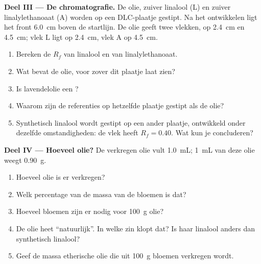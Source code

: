 \begin{problem}
\medskip
\noindent\textbf{Deel III --- De chromatografie.}
De olie, zuiver linalool (L) en zuiver linalylethanoaat (A) worden op een
DLC-plaatje gestipt. Na het ontwikkelen ligt het front \qty{6.0}{cm}
boven de startlijn. De olie geeft twee vlekken, op \qty{2.4}{cm} en
\qty{4.5}{cm}; vlek L ligt op \qty{2.4}{cm}, vlek A op \qty{4.5}{cm}.
\begin{enumerate}[resume]
  \item Bereken de $R_f$ van linalool en van linalylethanoaat.
  \item Wat bevat de olie, voor zover dit plaatje laat zien?
  \item Is lavendelolie een ?
  \item Waarom zijn de referenties op hetzelfde plaatje gestipt als de
        olie?
  \item Synthetisch linalool wordt gestipt op een ander plaatje,
        ontwikkeld onder dezelfde omstandigheden: de vlek heeft
        $R_f = 0.40$. Wat kun je concluderen?
\end{enumerate}

\medskip
\noindent\textbf{Deel IV --- Hoeveel olie?}
De verkregen olie vult \qty{1.0}{mL}; \qty{1}{mL} van deze olie weegt
\qty{0.90}{g}.
\begin{enumerate}[resume]
  \item Hoeveel olie is er verkregen?
  \item Welk percentage van de massa van de bloemen is dat?
  \item Hoeveel bloemen zijn er nodig voor \qty{100}{g} olie?
  \item De olie heet ``natuurlijk''. In welke zin klopt dat? Is haar
        linalool anders dan synthetisch linalool?
  \item Geef de massa etherische olie die uit \qty{100}{g} bloemen
        verkregen wordt.
\end{enumerate}
\end{problem}
